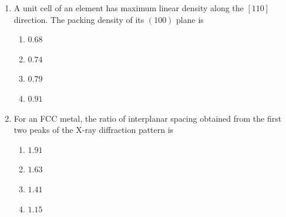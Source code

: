 \documentclass[journal]{IEEEtran}
\theoremstyle{remark}
\begin{document}
\begin{enumerate}
\item A unit cell of an element has maximum linear density along the $[110]$ direction. The packing density of its $(100)$ plane is
\hfill{}
\begin{multicols}{4}
\begin{enumerate}
\item  $0.68$
\item  $0.74 $
\item $0.79$ 
\item $0.91$
\end{enumerate}
\end{multicols}

\item For an FCC metal, the ratio of interplanar spacing obtained from the first two peaks of the X-ray diffraction pattern is  \hfill{}
\begin{multicols}{4}
\begin{enumerate}
\item  $1.91$
\item  $1.63$ 
\item $1.41$ 
\item $1.15 $
\end{enumerate}
\end{multicols}


\end{enumerate}
\end{document}
